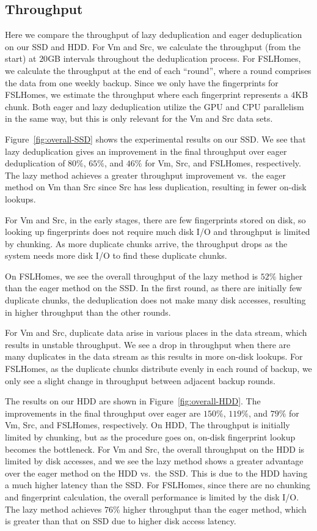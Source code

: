 \documentclass[prodmode,acmtecs]{acmsmall}
\begin{document}
\subsection{Throughput}

Here we compare the throughput of lazy deduplication and eager deduplication on our SSD and HDD.  For Vm and Src, we calculate the throughput (from the start) at $20$GB intervals throughout the deduplication process.  For FSLHomes, we calculate the throughput at the end of each ``round'', where a round comprises the data from one weekly backup.  Since we only have the fingerprints for FSLHomes, we estimate the throughput where each fingerprint represents a $4$KB chunk.  Both eager and lazy deduplication utilize the GPU and CPU parallelism in the same way, but this is only relevant for the Vm and Src data sets.

Figure~\ref{fig:overall-SSD} shows the experimental results on our SSD. We see that lazy deduplication gives an improvement in the final throughput over eager deduplication of $80\%$, $65\%$, and $46\%$ for Vm, Src, and FSLHomes, respectively.  The lazy method achieves a greater throughput improvement vs.\ the eager method on Vm than Src since Src has less duplication, resulting in fewer on-disk lookups.

For Vm and Src, in the early stages, there are few fingerprints stored on disk, so looking up fingerprints does not require much disk I/O and throughput is limited by chunking. As more duplicate chunks arrive, the throughput drops as the system needs more disk I/O to find these duplicate chunks.

On FSLHomes, we see the overall throughput of the lazy method is $52\%$ higher than the eager method on the SSD. In the first round, as there are initially few duplicate chunks, the deduplication does not make many disk accesses, resulting in higher throughput than the other rounds.

For Vm and Src, duplicate data arise in various places in the data stream, which results in unstable throughput. We see a drop in throughput when there are many duplicates in the data stream as this results in more on-disk lookups.  For FSLHomes, as the duplicate chunks distribute evenly in each round of backup, we only see a slight change in throughput between adjacent backup rounds.

The results on our HDD are shown in Figure~\ref{fig:overall-HDD}. The improvements in the final throughput over eager are $150\%$, $119\%$, and  $79\%$ for Vm, Src, and FSLHomes, respectively. On HDD, The throughput is initially limited by chunking, but as the procedure goes on, on-disk fingerprint lookup becomes the bottleneck. For Vm and Src, the overall throughput on the HDD is limited by disk accesses, and we see the lazy method shows a greater advantage over the eager method on the HDD vs.\ the SSD. This is due to the HDD having a much higher latency than the SSD. For FSLHomes, since there are no chunking and fingerprint calculation, the overall performance is limited by the disk I/O. The lazy method achieves $76$\% higher throughput than the eager method, which is greater than that on SSD due to higher disk access latency.
\end{document}
